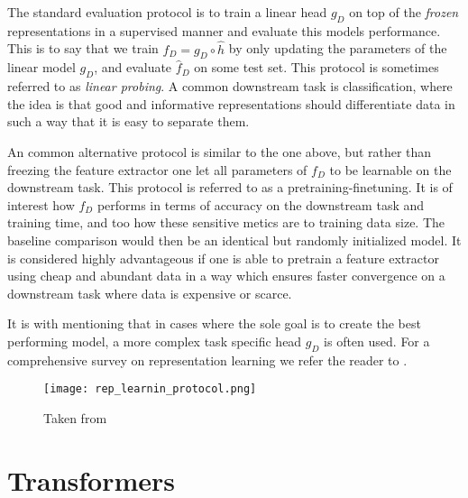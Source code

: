 \documentclass[../../thesis.tex]{subfiles}
\begin{document}
The standard evaluation protocol is to train a linear head $g_D$ on top of the \textit{frozen} representations in a supervised manner and evaluate this models performance. This is to say that we train  $f_D = g_D\circ \widehat{h}$ by only updating the parameters of the linear model $g_D$, and evaluate $\widehat{f}_D$ on some test set. This protocol is sometimes referred to as \textit{linear probing}. A common downstream task is classification, where the idea is that good and informative representations should differentiate data in such a way that it is easy to separate them. \newline

An common alternative protocol is similar to the one above, but rather than freezing the feature extractor one let all parameters of $f_D$ to be learnable on the downstream task. This protocol is referred to as a pretraining-finetuning. It is of interest how $f_D$ performs in terms of accuracy on the downstream task and training time, and too how these sensitive metics are to training data size. The baseline comparison would then be an identical but randomly initialized model. It is considered highly advantageous if one is able to pretrain a feature extractor using cheap and abundant data in a way which ensures faster convergence on a downstream task where data is expensive or scarce.\newline

It is with mentioning that in cases where the sole goal is to create the best performing model, a more complex task specific head $g_D$ is often used. For a comprehensive survey on representation learning we refer the reader to \cite{nozawa2022empirical}.


\begin{figure}[h]
    \texttt{[image: rep\_learnin\_protocol.png]}
    \centering    
    \caption{Taken from \cite{nozawa2022empirical}}
\end{figure}








\section{Transformers}
\end{document}
